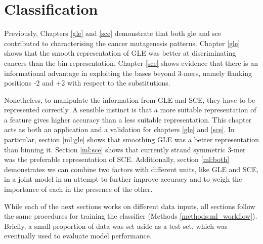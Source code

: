 \chapter{Classification}\label{ml}

Previously, Chapters \ref{gle} and \ref{sce} demonstrate that both \gls{gle} and \gls{sce} contributed to characterising the cancer mutagenesis patterns. Chapter \ref{gle} shows that the smooth representation of GLE was better at discriminating cancers than the bin representation. Chapter \ref{sce} shows evidence that there is an informational advantage in exploiting the bases beyond 3-mers, namely flanking positions -2 and +2 with respect to the substitutions. 

Nonetheless, to manipulate the information from GLE and SCE, they have to be represented correctly. A sensible instinct is that a more suitable representation of a feature gives higher accuracy than a less suitable representation. This chapter acts as both an application and a validation for chapters \ref{gle} and \ref{sce}. In particular, section \ref{ml:gle} shows that smoothing GLE was a better representation than binning it. Section \ref{ml:sce} shows that currently strand symmetric 3-mer was the preferable representation of SCE. Additionally, section \ref{ml:both} demonstrates we can combine two factors with different units, like GLE and SCE, in a joint model in an attempt to further improve accuracy and to weigh the importance of each in the presence of the other.

While each of the next sections works on different data inputs, all sections follow the same procedures for training the classifier (Methods \ref{methods:ml_workflow}). Briefly, a small proportion of data was set aside as a test set, which was eventually used to evaluate model performance.

